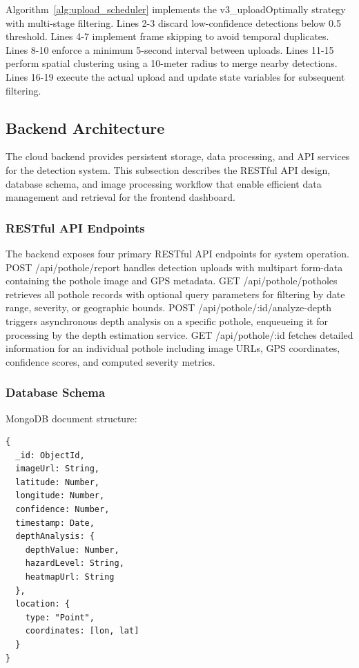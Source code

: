 \documentclass{ieeeaccess}
\begin{document}
Algorithm~\ref{alg:upload_scheduler} implements the v3\_uploadOptimally strategy with multi-stage filtering. Lines 2-3 discard low-confidence detections below 0.5 threshold. Lines 4-7 implement frame skipping to avoid temporal duplicates. Lines 8-10 enforce a minimum 5-second interval between uploads. Lines 11-15 perform spatial clustering using a 10-meter radius to merge nearby detections. Lines 16-19 execute the actual upload and update state variables for subsequent filtering.

\subsection{Backend Architecture}

The cloud backend provides persistent storage, data processing, and API services for the detection system. This subsection describes the RESTful API design, database schema, and image processing workflow that enable efficient data management and retrieval for the frontend dashboard.

\subsubsection{RESTful API Endpoints}
The backend exposes four primary RESTful API endpoints for system operation. POST /api/pothole/report handles detection uploads with multipart form-data containing the pothole image and GPS metadata. GET /api/pothole/potholes retrieves all pothole records with optional query parameters for filtering by date range, severity, or geographic bounds. POST /api/pothole/:id/analyze-depth triggers asynchronous depth analysis on a specific pothole, enqueueing it for processing by the depth estimation service. GET /api/pothole/:id fetches detailed information for an individual pothole including image URLs, GPS coordinates, confidence scores, and computed severity metrics.

\subsubsection{Database Schema}
MongoDB document structure:
\begin{verbatim}
{
  _id: ObjectId,
  imageUrl: String,
  latitude: Number,
  longitude: Number,
  confidence: Number,
  timestamp: Date,
  depthAnalysis: {
    depthValue: Number,
    hazardLevel: String,
    heatmapUrl: String
  },
  location: {
    type: "Point",
    coordinates: [lon, lat]
  }
}
\end{verbatim}
\end{document}
